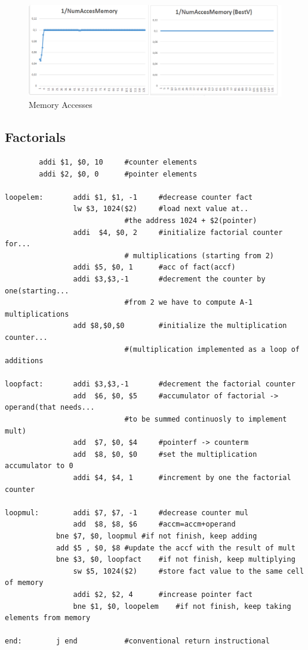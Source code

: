 \documentclass[a4paper,twoside]{article}
\theoremstyle{definition}
\theoremstyle{remark}
\begin{document}
\begin{figure}[H]
\raggedright
\includegraphics[scale=0.5]{Immagini/04}
\caption{Memory Accesses}
\end{figure}

\newpage

\subsection{Factorials}

\begin{lstlisting}
		addi $1, $0, 10		#counter elements
		addi $2, $0, 0		#pointer elements
	
loopelem:   	addi $1, $1, -1		#decrease counter fact
            	lw $3, 1024($2)		#load next value at.. 
             				#the address 1024 + $2(pointer)
            	addi  $4, $0, 2		#initialize factorial counter for...
            				# multiplications (starting from 2)
            	addi $5, $0, 1		#acc of fact(accf)
            	addi $3,$3,-1		#decrement the counter by one(starting...
            				#from 2 we have to compute A-1 multiplications 
            	add $8,$0,$0		#initialize the multiplication counter... 
            				#(multiplication implemented as a loop of additions

loopfact:   	addi $3,$3,-1		#decrement the factorial counter 
            	add  $6, $0, $5		#accumulator of factorial -> operand(that needs...
            				#to be summed continuosly to implement mult)
            	add  $7, $0, $4		#pointerf -> counterm
            	add  $8, $0, $0		#set the multiplication accumulator to 0
            	addi $4, $4, 1		#increment by one the factorial counter 

loopmul:    	addi $7, $7, -1		#decrease counter mul
            	add  $8, $8, $6		#accm=accm+operand
	    	bne $7, $0, loopmul	#if not finish, keep adding
	    	add $5 , $0, $8	#update the accf with the result of mult
	    	bne $3, $0, loopfact	#if not finish, keep multiplying
            	sw $5, 1024($2)		#store fact value to the same cell of memory
            	addi $2, $2, 4		#increase pointer fact
            	bne $1, $0, loopelem	#if not finish, keep taking elements from memory
			
end: 		j end			#conventional return instructional
			
			

			

\end{lstlisting}
\end{document}
